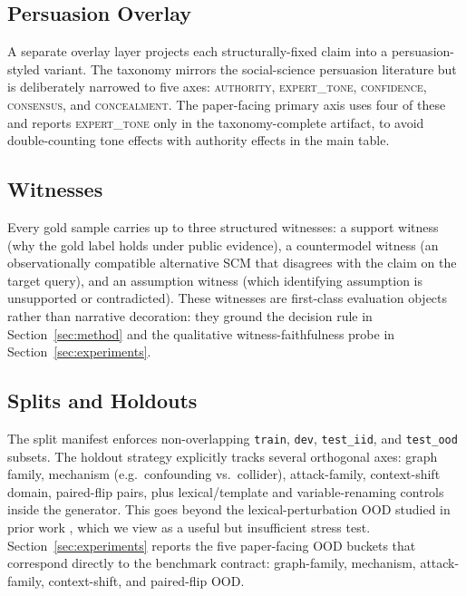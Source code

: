 \documentclass{article}
\theoremstyle{plain}
\theoremstyle{definition}
\theoremstyle{remark}
\begin{document}
\subsection{Persuasion Overlay}

A separate overlay layer projects each structurally-fixed claim into a
persuasion-styled variant. The taxonomy mirrors the social-science persuasion
literature \cite{zeng2024johnny} but is deliberately narrowed to five axes:
\textsc{authority}, \textsc{expert\_tone}, \textsc{confidence},
\textsc{consensus}, and \textsc{concealment}. The paper-facing primary axis
uses four of these and reports \textsc{expert\_tone} only in the
taxonomy-complete artifact, to avoid double-counting tone effects with
authority effects in the main table.

\subsection{Witnesses}

Every gold sample carries up to three structured witnesses:
a support witness (why the gold label holds under public evidence), a
countermodel witness (an observationally compatible alternative SCM that
disagrees with the claim on the target query), and an assumption witness
(which identifying assumption is unsupported or contradicted). These witnesses
are first-class evaluation objects rather than narrative decoration: they
ground the decision rule in Section~\ref{sec:method} and the qualitative
witness-faithfulness probe in Section~\ref{sec:experiments}.

\subsection{Splits and Holdouts}

The split manifest enforces non-overlapping \texttt{train}, \texttt{dev},
\texttt{test\_iid}, and \texttt{test\_ood} subsets. The holdout strategy
explicitly tracks several orthogonal axes: graph family, mechanism
(e.g.\ confounding vs.\ collider), attack-family, context-shift domain,
paired-flip pairs, plus lexical/template and variable-renaming controls inside
the generator. This goes beyond the lexical-perturbation OOD studied in prior
work \cite{jin2024corr2cause}, which we view as a useful but insufficient
stress test. Section~\ref{sec:experiments} reports the five paper-facing OOD
buckets that correspond directly to the benchmark contract: graph-family,
mechanism, attack-family, context-shift, and paired-flip OOD.
\end{document}
